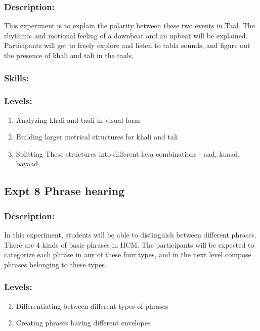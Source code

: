 \documentclass[11pt]{article}
\begin{document}
\subsubsection{Description:}
\label{sec-1-8-1}

This experiment is to explain the polarity between these two events in
Taal. The rhythmic and motional feeling of a downbeat and an upbeat
will be explained. Participants will get to freely explore and listen
to tabla sounds, and figure out the presence of khali and tali in the taals.
\subsubsection{Skills:}
\label{sec-1-8-2}
\subsubsection{Levels:}
\label{sec-1-8-3}


\begin{enumerate}
\item Analyzing khali and taali in visual form
\item Building larger metrical structures for khali and tali
\item Splitting These structures into different laya combinations - aad, kuaad, bayaad
\end{enumerate}
\subsection{Expt 8 Phrase hearing}
\label{sec-1-9}
\subsubsection{Description:}
\label{sec-1-9-1}

In this experiment, students will be able to distinguish between
different phrases. There are 4 kinds of basic phrases in HCM. The
participants will be expected to categorize each phrase in any of
these four types, and in the next level compose phrases belonging to
these types.
\subsubsection{Levels:}
\label{sec-1-9-2}


\begin{enumerate}
\item Differentiating between different types of phrases
\item Creating phrases having different envelopes
\end{enumerate}
\end{document}
